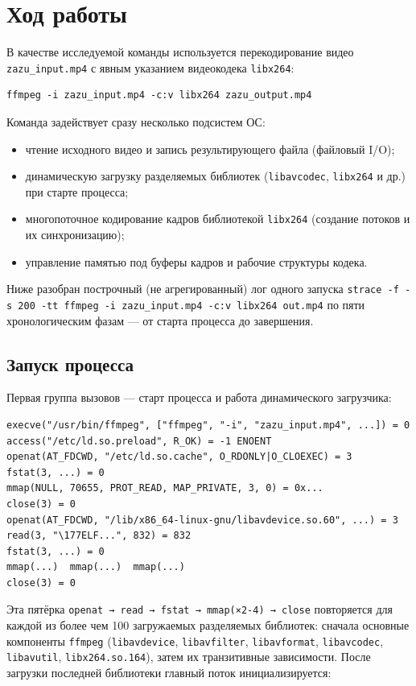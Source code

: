 \documentclass[12pt,a4paper]{article}
\begin{document}
\section{Ход работы}
В качестве исследуемой команды используется перекодирование видео
\texttt{zazu\_input.mp4} с явным указанием видеокодека
\texttt{libx264}:

\begin{lstlisting}
ffmpeg -i zazu_input.mp4 -c:v libx264 zazu_output.mp4
\end{lstlisting}

Команда задействует сразу несколько подсистем ОС:
\begin{itemize}
    \item чтение исходного видео и запись результирующего файла (файловый I/O);
    \item динамическую загрузку разделяемых библиотек (\texttt{libavcodec},
          \texttt{libx264} и др.) при старте процесса;
    \item многопоточное кодирование кадров библиотекой \texttt{libx264}
          (создание потоков и их синхронизацию);
    \item управление памятью под буферы кадров и рабочие структуры кодека.
\end{itemize}

Ниже разобран построчный (не агрегированный) лог одного запуска
\texttt{strace -f -s 200 -tt ffmpeg -i zazu\_input.mp4 -c:v libx264 out.mp4}
по пяти хронологическим фазам — от старта процесса до завершения.

\subsection{Запуск процесса}
Первая группа вызовов — старт процесса и работа динамического загрузчика:

\begin{lstlisting}
execve("/usr/bin/ffmpeg", ["ffmpeg", "-i", "zazu_input.mp4", ...]) = 0
access("/etc/ld.so.preload", R_OK) = -1 ENOENT
openat(AT_FDCWD, "/etc/ld.so.cache", O_RDONLY|O_CLOEXEC) = 3
fstat(3, ...) = 0
mmap(NULL, 70655, PROT_READ, MAP_PRIVATE, 3, 0) = 0x...
close(3) = 0
openat(AT_FDCWD, "/lib/x86_64-linux-gnu/libavdevice.so.60", ...) = 3
read(3, "\177ELF...", 832) = 832
fstat(3, ...) = 0
mmap(...)  mmap(...)  mmap(...)
close(3) = 0
\end{lstlisting}

Эта пятёрка \texttt{openat → read → fstat → mmap(×2-4) → close} повторяется
для каждой из более чем 100 загружаемых разделяемых библиотек: сначала
основные компоненты \texttt{ffmpeg} (\texttt{libavdevice}, \texttt{libavfilter},
\texttt{libavformat}, \texttt{libavcodec}, \texttt{libavutil}, \texttt{libx264.so.164}),
затем их транзитивные зависимости. После загрузки последней библиотеки
главный поток инициализируется:
\end{document}
